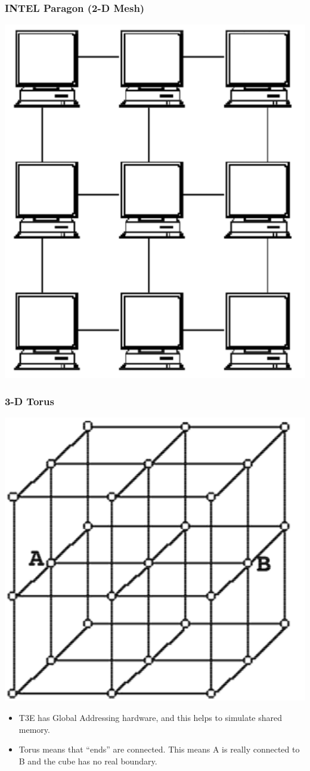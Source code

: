 \documentclass[12pt, a4paper]{book}
\begin{document}
\subsubsection{INTEL Paragon (2-D Mesh)}
\includegraphics[width=0.5\linewidth]{figures/INTEL Paragon (2-D Mesh).png}
\subsubsection{3-D Torus}
\begin{minipage}{0.4\linewidth}
    \includegraphics[width=0.9\linewidth]{figures/3-D Torus.png}
\end{minipage}
\begin{minipage}{0.4\linewidth}
    \begin{itemize}
        \item T3E has Global
              Addressing hardware,
              and this helps to
              simulate shared
              memory.
        \item Torus means that “ends”
              are connected. This
              means A is really
              connected to B and the
              cube has no real
              boundary.
    \end{itemize}
\end{minipage}
\end{document}
